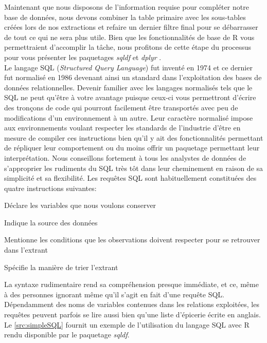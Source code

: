 \vspace{\baselineskip}
\noindent
Maintenant que nous disposons de l'information requise pour compléter notre base de données, nous devons combiner la table primaire avec les sous-tables créées lors de nos extractions et refaire un dernier filtre final pour se débarrasser de tout ce qui ne sera plus utile. Bien que les fonctionnalités de base de R vous permettraient d'accomplir la tâche, nous profitons de cette étape du processus pour vous présenter les paquetages \emph{sqldf} \cite{Rpackage:sqldf} et \emph{dplyr} \cite{Rpackage:plyr}. \\

\noindent
Le langage SQL (\emph{Structured Query Language}) fut inventé en 1974 et ce dernier fut normalisé en 1986 devenant ainsi un standard dans l'exploitation des bases de données relationnelles. Devenir familier avec les langages normalisés tels que le SQL ne peut qu'être à votre avantage puisque ceux-ci vous permettront d'écrire des tronçons de code qui pourront facilement être transportés avec peu de modifications d'un environnement à un autre. Leur caractère normalisé impose aux environnements voulant respecter les standards de l'industrie d'être en mesure de compiler ces instructions bien qu'il y ait des fonctionnalités permettant de répliquer leur comportement ou du moins offrir un paquetage permettant leur interprétation. \cite{SQL} Nous conseillons fortement à tous les analystes de données de s'approprier les rudiments du SQL très tôt dans leur cheminement en raison de sa simplicité et sa flexibilité. Les requêtes SQL sont habituellement constituées des quatre instructions suivantes: \\

\begin{description}[style=multiline,leftmargin=2cm]
	\item[Select] Déclare les variables que nous voulons conserver
	\item[From] Indique la source des données
	\item[Where] Mentionne les conditions que les observations doivent respecter pour se retrouver dans l'extrant
	\item[Order by] Spécifie la manière de trier l'extrant
\end{description}

\noindent
La syntaxe rudimentaire rend sa compréhension presque immédiate, et ce, même à des personnes ignorant même qu'il s'agit en fait d'une requête SQL. Dépendamment des noms de variables contenues dans les relations exploitées, les requêtes peuvent parfois se lire aussi bien qu'une liste d'épicerie écrite en anglais. Le \autoref{src:simpleSQL} fournit un exemple de l'utilisation du langage SQL avec R rendu disponible par le paquetage \emph{sqldf}.

